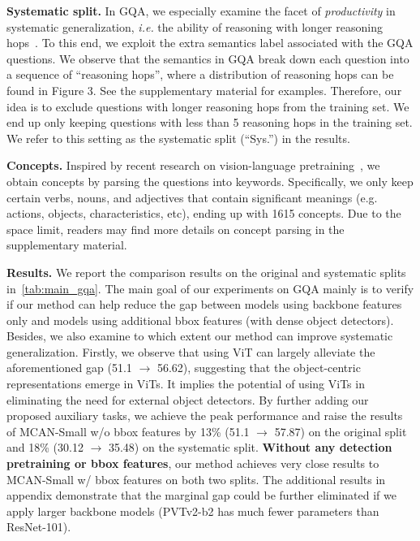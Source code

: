 \documentclass{article} \usepackage{iclr2022_conference,times}
\renewcommand{\paragraph}[1]{\noindent\textbf{#1.}}
\begin{document}
\paragraph{Systematic split} In GQA, we especially examine the facet of \emph{productivity} in systematic generalization, \emph{i.e.} the ability of reasoning with longer reasoning hops~\citep{systematic1}. To this end, we exploit the extra semantics label associated with the GQA questions. We observe that the semantics in GQA break down each question into a sequence of ``reasoning hops'', where a distribution of reasoning hops can be found in Figure 3. See the supplementary material for examples. Therefore, our idea is to exclude questions with longer reasoning hops from the training set.  We end up only keeping questions with less than 5 reasoning hops in the training set. We refer to this setting as the systematic split (``Sys.'') in the results.

\paragraph{Concepts} Inspired by recent research on vision-language pretraining~\citep{tan2019lxmert,li2019visualbert,li2020oscar}, we obtain concepts by parsing the questions into keywords. Specifically, we only keep certain verbs, nouns, and adjectives that contain significant meanings (e.g. actions, objects, characteristics, etc), ending up with 1615 concepts. 
Due to the space limit, readers may find more details on concept parsing in the supplementary material. 

\paragraph{Results} We report the comparison results on the original and systematic splits in~\autoref{tab:main_gqa}. The main goal of our experiments on GQA mainly is to verify if 
our method can help reduce the gap between models using backbone features only and models using additional bbox features (with dense object detectors). Besides, we also examine to which extent our method can improve systematic generalization.
Firstly, we observe that using ViT can largely alleviate the aforementioned gap (51.1 $\rightarrow$ 56.62), suggesting that the object-centric representations emerge in ViTs. It implies the potential of using ViTs in eliminating the need for external object detectors. By further adding our proposed auxiliary tasks, we achieve the peak performance and raise the results of MCAN-Small w/o bbox features by 13\% (51.1 $\rightarrow$ 57.87) on the original split and 18\% (30.12 $\rightarrow$ 35.48) on the systematic split.
\textbf{Without any detection pretraining or bbox features}, 
our method achieves very close results to MCAN-Small w/ bbox features on both two splits.
The additional results in appendix demonstrate that the marginal gap could be further eliminated if we apply larger backbone models (PVTv2-b2 has much fewer parameters than ResNet-101).
\end{document}
